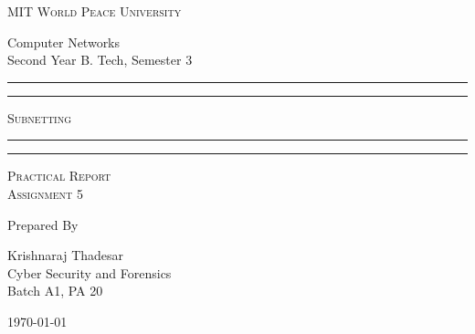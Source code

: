 \documentclass[11pt]{article}
\begin{document}
\begin{titlepage}
	\centering


	\huge\textsc{
		MIT World Peace University
	}\\

	\vspace{0.75\baselineskip} %

	\LARGE{
		Computer Networks\\
		Second Year B. Tech, Semester 3
	}

	\vfill %


	\rule{\textwidth}{1.6pt}\vspace*{-\baselineskip}\vspace*{2pt}
	\rule{\textwidth}{0.6pt}
	\vspace{0.75\baselineskip} %



	\huge{\textsc{
			Subnetting
		}} \\



	\vspace{0.5\baselineskip} %
	\rule{\textwidth}{0.6pt}\vspace*{-\baselineskip}\vspace*{2.8pt}
	\rule{\textwidth}{1.6pt}

	\vspace{1\baselineskip} %


	\LARGE\textsc{
		Practical Report\\
		Assignment 5
	} %
	\vfill


	Prepared By
	\vspace{0.5\baselineskip} %

	\Large{
		Krishnaraj Thadesar \\
		Cyber Security and Forensics\\
		Batch A1, PA 20
	}


	\vspace{0.5\baselineskip} %
	\today

\end{titlepage}
\end{document}
